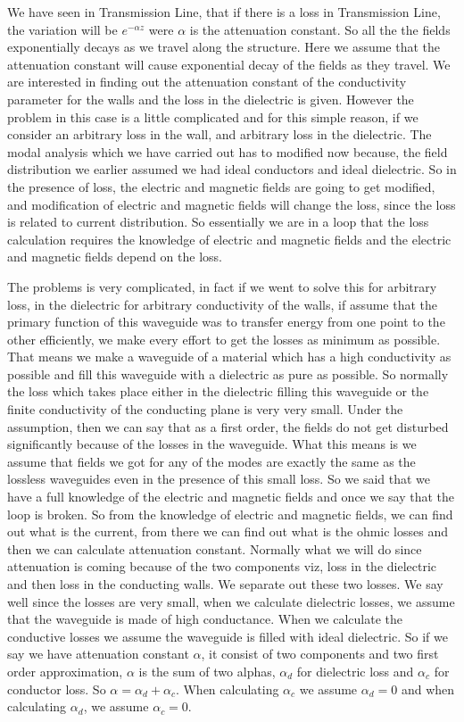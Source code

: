 We have seen in Transmission Line, that if there is a loss in Transmission Line, the variation will be $e^{-\alpha z}$ were $\alpha$ is the attenuation constant. So all the the fields exponentially decays as we travel along the structure. Here we assume that the attenuation constant will cause exponential decay of the fields as they travel. We are interested in finding out the attenuation constant of the conductivity parameter for the walls and the loss in the dielectric is given. However the problem in this case is a little complicated and for this simple reason, if we consider an arbitrary loss in the wall, and arbitrary loss in the dielectric. The modal analysis which we have carried out has to modified now because, the field distribution we earlier assumed we had ideal conductors and ideal dielectric. So in the presence of loss, the electric and magnetic fields are going to get modified, and modification of electric and magnetic fields will change the loss, since the loss is related to current distribution. So essentially we are in a loop that the loss calculation requires the knowledge of electric and  magnetic fields and the electric and magnetic fields depend on the loss.
	
The problems is very complicated, in fact if we went to solve this for arbitrary loss, in the dielectric for arbitrary conductivity of the walls, if assume that the primary function of this waveguide was to transfer energy from one point to the other efficiently, we make every effort to get the losses as minimum as possible.
That means we make a waveguide of a material which has a high conductivity as possible and fill this waveguide with a dielectric as pure as possible. So normally the loss which takes place either in the dielectric filling this waveguide or the finite conductivity of the conducting plane is very very small. Under the assumption, then we can say that as a first order, the fields do not get disturbed significantly because of the losses in the waveguide. What this means is we assume that fields we got for any of the modes are exactly the same as the lossless waveguides even in the presence of this small loss.
So we said that we have a full knowledge of the electric and magnetic fields and once we say that the loop is broken. So from the knowledge of electric and magnetic fields, we can find out what is the current, from there we can find out what is the ohmic losses and then we can calculate attenuation constant. Normally what we will do since attenuation is coming because of the two components viz, loss in the dielectric and then loss in the conducting walls. We separate out these two losses. We say well since the losses are very small, when we calculate dielectric losses, we assume that the waveguide is made of high conductance. When we calculate the conductive losses we assume the waveguide is filled with ideal dielectric. So if we say we have attenuation constant $\alpha$, it consist of two components and two first order approximation, $\alpha$ is the sum of two alphas, $\alpha_{d}$ for dielectric loss and  $\alpha_{c}$ for conductor loss. So $\alpha =  \alpha_{d} +  \alpha_{c}$. When calculating $\alpha_{c}$ we assume  $\alpha_{d} = 0$ and when calculating  $\alpha_{d}$, we assume  $\alpha_{c} = 0$.
	
